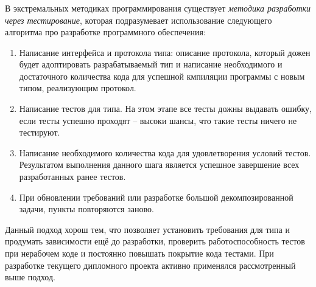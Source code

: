 \subsubsection{}
\label{sec:testing:unit:tdd}

В экстремальных методиках программирования существует \textit{методика разработки через тестирование}, которая подразумевает использование следующего алгоритма про разработке программного обеспечения:

\begin{enumerate}
	\item Написание интерфейса и протокола типа: описание протокола, который дожен будет адоптировать разрабатываемый тип и написание необходимого и достаточного количества кода для успешной кмпиляции программы с новым типом, реализующим протокол.
	\item Написание тестов для типа. На этом этапе все тесты дожны выдавать ошибку, если тесты успешно проходят -- высоки шансы, что такие тесты ничего не тестируют.
	\item Написание необходимого количества кода для удовлетворения условий тестов. Результатом выполнения данного шага является успешное завершение всех разработанных ранее тестов.
	\item При обновлении требований или разработке большой декомпозированной задачи, пункты повторяются заново.
\end{enumerate}

Данный подход хорош тем, что позволяет установить требования для типа и продумать зависимости ещё до разработки, проверить работоспособность тестов при нерабочем коде и постоянно повышать покрытие кода тестами. При разработке текущего дипломного проекта активно применялся рассмотренный выше подход.